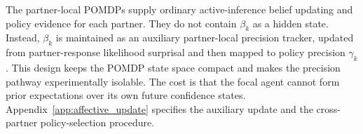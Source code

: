 The partner-local POMDPs supply ordinary active-inference belief updating and policy evidence for each partner. They do not contain \(\beta_k\) as a hidden state. Instead, \(\beta_k\) is maintained as an auxiliary partner-local precision tracker, updated from partner-response likelihood surprisal and then mapped to policy precision \(\gamma_k\). This design keeps the POMDP state space compact and makes the precision pathway experimentally isolable. The cost is that the focal agent cannot form prior expectations over its own future confidence states. Appendix~\ref{app:affective_update} specifies the auxiliary update and the cross-partner policy-selection procedure.
